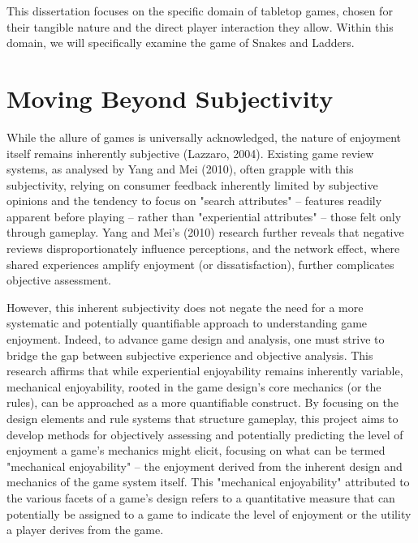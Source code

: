 This dissertation focuses on the specific domain of tabletop games, chosen for their tangible nature and the direct player interaction they allow.  Within this domain, we will specifically examine the game of Snakes and Ladders.

\section{Moving Beyond Subjectivity}
While the allure of games is universally acknowledged, the nature of enjoyment itself remains inherently subjective (Lazzaro, 2004). Existing game review systems, as analysed by Yang and Mei (2010), often grapple with this subjectivity, relying on consumer feedback inherently limited by subjective opinions and the tendency to focus on "search attributes" – features readily apparent before playing – rather than "experiential attributes" – those felt only through gameplay.  Yang and Mei’s (2010) research further reveals that negative reviews disproportionately influence perceptions, and the network effect, where shared experiences amplify enjoyment (or dissatisfaction), further complicates objective assessment.

However, this inherent subjectivity does not negate the need for a more systematic and potentially quantifiable approach to understanding game enjoyment. Indeed, to advance game design and analysis, one must strive to bridge the gap between subjective experience and objective analysis. This research affirms that while experiential enjoyability remains inherently variable, mechanical enjoyability, rooted in the game design's core mechanics (or the rules), can be approached as a more quantifiable construct. By focusing on the design elements and rule systems that structure gameplay, this project aims to develop methods for objectively assessing and potentially predicting the level of enjoyment a game's mechanics might elicit, focusing on what can be termed "mechanical enjoyability" – the enjoyment derived from the inherent design and mechanics of the game system itself.  This "mechanical enjoyability" attributed to the various facets of a game's design refers to a quantitative measure that can potentially be assigned to a game to indicate the level of enjoyment or the utility a player derives from the game.

